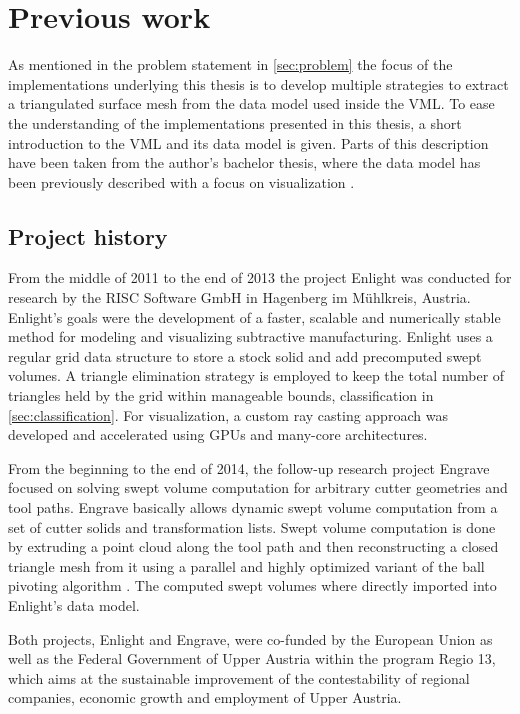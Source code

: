 \chapter{Previous work}
\label{ch:previous_work}

As mentioned in the problem statement in \cref{sec:problem} the focus of the implementations underlying this thesis is to develop multiple strategies to extract a triangulated surface mesh from the data model used inside the VML.
To ease the understanding of the implementations presented in this thesis, a short introduction to the VML and its data model is given.
Parts of this description have been taken from the author's bachelor thesis, where the data model has been previously described with a focus on visualization \cite{bachelor}.

\section{Project history}
\label{sec:project_history}

From the middle of 2011 to the end of 2013 the project Enlight was conducted for research by the RISC Software GmbH in Hagenberg im Mühlkreis, Austria.
Enlight's goals were the development of a faster, scalable and numerically stable method for modeling and visualizing subtractive manufacturing.
Enlight uses a regular grid data structure to store a stock solid and add precomputed swept volumes.
A triangle elimination strategy is employed to keep the total number of triangles held by the grid within manageable bounds, \cf classification in \cref{sec:classification}.
For visualization, a custom ray casting approach was developed \cite{enlight} and accelerated using GPUs and many-core architectures.

From the beginning to the end of 2014, the follow-up research project Engrave focused on solving swept volume computation for arbitrary cutter geometries and tool paths.
Engrave basically allows dynamic swept volume computation from a set of cutter solids and transformation lists.
Swept volume computation is done by extruding a point cloud along the tool path and then reconstructing a closed triangle mesh from it using a parallel and highly optimized variant of the ball pivoting algorithm \cite{engrave}.
The computed swept volumes where directly imported into Enlight's data model.

Both projects, Enlight and Engrave, were co-funded by the European Union as well as the Federal Government of Upper Austria within the program Regio 13, which aims at the sustainable improvement of the contestability of regional companies, economic growth and employment of Upper Austria.

